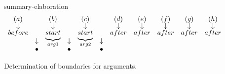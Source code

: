 \begin{figure}[!htbp]
\centering

summary-elaboration
\[
\begin{array}{*{11}{c}}
(a)& &(b)& &(c)& &(d)&(e)&(f)&(g)&(h)\\[-2pt]
\downarrow& &\downarrow& &\downarrow& &\downarrow&\downarrow&\downarrow&\downarrow&\downarrow\\[-2pt]
before& &\undermat{arg1}{start}& &\undermat{arg2}{start}& &after&after&after&after&after\\
&\downarrow& &\downarrow& &\downarrow& & & & & \\
&\bullet& &\bullet& &\bullet& & & & &
\end{array}
\]

\caption{\label{i:rare-bounds} Determination of boundaries for arguments. }

\end{figure}
